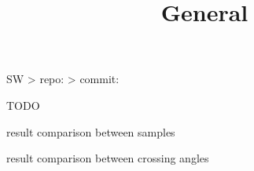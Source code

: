 


\newpage %

\def\author{J.~Kašpar}
\def\caption{CTPPS alignment 2018}
\def\date{\the\year/\the\month/\the\day}

\let\NormalFonts\SetFontSizesX

\newpage %
\title{General}

\> SW
\>> repo: %
\>> commit: %

\> TODO
\iffalse
\> input data
\>> alignment runs:\\ /eos/totem/data/ctpps/reconstruction/2017/alignment\_run\_September/version7
\>> physics runs:\\ /eos/totem/data/ctpps/reconstruction/2017/postTS2\_alignment\_data/version5
\>>> from Run2017E-17Nov2017-v1/AOD and Run2017F-17Nov2017-v1/AOD

\> re-reco performed with\\
/afs/cern.ch/work/j/jkaspar/software/ctpps/development/uniform\_pixel\_reco\_2017/CMSSW\_10\_2\_0
\>> pixel tracks only build with planes that did not change settings during the post-TS2 period
\>>> sector 45: used only planes 0, 2 and 4
\>>> sector 56: used only planes 0, 1 and 3
\fi


\newpage %


\newpage %

\> result comparison between samples

\centerline{}

\newpage %

\> result comparison between crossing angles

\centerline{}



